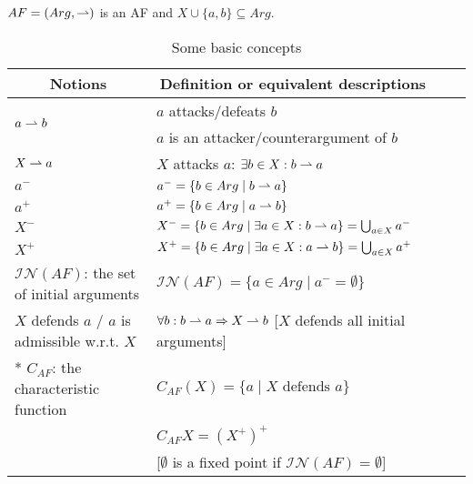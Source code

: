 \begin{table}[ht!]
    \centering
    \caption{Some basic concepts}
    \label{tab: basic notions of AAT}
    $AF = (Arg,\rightharpoonup)$ is an AF and $X\cup\{a,b\} \subseteq Arg$.
    \vspace{1em}

    \renewcommand{\arraystretch}{1.3}
    \begin{tabular}{l||lll}
    \hline
    \multicolumn{1}{c}{Notions}  & 
    \multicolumn{1}{c}{Definition or equivalent descriptions} \\
    \hline

    \multirow{2}{*}{$a \rightharpoonup b$}   &
    $a$ attacks/defeats $b$  \\ 
    &  $a$ is an attacker/counterargument of $b$   \\

    \hdashline

    $X \rightharpoonup a$ \qquad   & 
    $X$ attacks $a$: $\exists b \in X: b \rightharpoonup a$  \\

    
    
    $a^-$ &  
    $a^- = \{b \in Arg \mid b \rightharpoonup a\}$  \\

    $a^+$ &  
    $a^+ = \{b \in Arg \mid a \rightharpoonup b\}$  \\

    $X^-$ &  
    $X^- = \{b \in Arg \mid \exists a \in X: b \rightharpoonup a\} = \bigcup_{a\in X} a^- $\\

    $X^+$ & 
    $X^+ = \{b \in Arg \mid \exists a \in X: a \rightharpoonup b\} = \bigcup_{a\in X} a^+$ \\

    $\mathcal{IN}(AF)$: the set of initial arguments &
    $\mathcal{IN}(AF) = \{a\in Arg \mid a^- = \emptyset\}$    \\

    $X$ defends $a$  / $a$ is admissible w.r.t. $X$ & 
    $\forall b: b \rightharpoonup a \Rightarrow X \rightharpoonup b$ 
    \hfill
    [$X$ defends all initial arguments] \\

    


    \hdashline

    \multirow{3}*{
    $C_{AF}$: the characteristic function}  
    & 
    $C_{AF} (X) = \{a \mid X \text{~defends~} a \}$   \\
    &  $C_{AF}{X} = (X^+)^+$  \\
    & [$\emptyset$ is a fixed point if $\mathcal{IN}(AF)=\emptyset$]  \\


\end{tabular}
\end{table}
